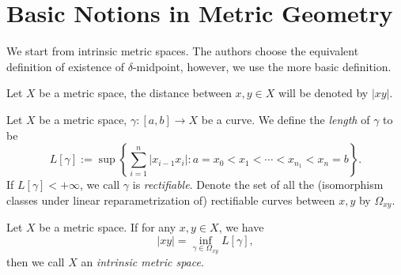 \section{Basic Notions in Metric Geometry}

We start from intrinsic metric spaces.
The authors choose the equivalent definition of existence of $\delta$-midpoint, however, we use the more basic definition.

\begin{nota}
    Let $X$ be a metric space, the distance between $x,y\in X$ will be denoted by $|xy|$.
\end{nota}

\begin{defn}
    Let $X$ be a metric space, $\gamma:[a,b]\to X$ be a curve.
    We define the \emph{length} of $\gamma$ to be
    \[L[\gamma]:=\sup\left\{\sum_{i=1}^n|x_{i-1}x_i|\colon a=x_0<x_1<\cdots<x_{n_1}<x_n=b\right\}.\]
    If $L[\gamma]<+\infty$, we call $\gamma$ is \emph{rectifiable}.
    Denote the set of all the (isomorphism classes under linear reparametrization of) rectifiable curves between $x,y$ by $\Omega_{xy}$.
\end{defn}

\begin{defn}
    Let $X$ be a metric space.
    If for any $x,y\in X$, we have
    \[|xy|=\inf_{\gamma\in\Omega_{xy}}L[\gamma],\]
    then we call $X$ an \emph{intrinsic metric space}.
\end{defn}

